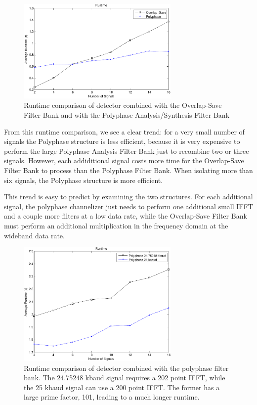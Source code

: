 \documentclass[12pt]{article}
\begin{document}
\begin{figure}[h!]
    \begin{center}
    \includegraphics[width=0.7\textwidth]{runtime_comparison_250}%
    \end{center}
    \caption{Runtime comparison of detector combined with the Overlap-Save
             Filter Bank and with the Polyphase Analysis/Synthesis Filter Bank}
    \label{fig:block_diagram}
\end{figure}

From this runtime comparison, we see a clear trend: for a very small number of
signals the Polyphase structure is less efficient, because it is very 
expensive to perform the large Polyphase Analysis Filter Bank just to recombine
two or three signals. However, each addiditional signal costs more time for the 
Overlap-Save Filter Bank to process than the Polyphase Filter Bank. When 
isolating more than six signals, the Polyphase structure is more efficient.

This trend is easy to predict by examining the two structures. For each
additional signal, the polyphase channelizer just needs to perform one
additional small IFFT and a couple more filters at a low data rate, while the
Overlap-Save Filter Bank must perform an additional multiplication in the
frequency domain at the wideband data rate.

\begin{figure}[h!]
    \begin{center}
    \includegraphics[width=0.7\textwidth]{fft_runtime_comparison}%
    \end{center}
    \caption{Runtime comparison of detector combined with the polyphase filter
             bank. The 24.75248 kbaud signal requires a 202 point IFFT, while 
             the 25 kbaud signal can use a 200 point IFFT. The former has a
             large prime factor, 101, leading to a much longer runtime.}
    \label{fig:block_diagram}
\end{figure}
\end{document}
